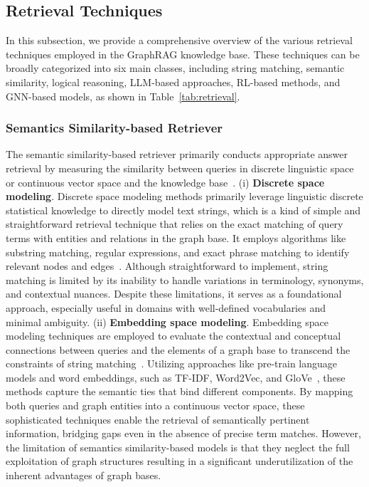 \documentclass[lettersize,journal]{IEEEtran}
\begin{document}
\subsection{Retrieval Techniques}

In this subsection, we provide a comprehensive overview of the various retrieval techniques employed in the GraphRAG knowledge base. These techniques can be broadly categorized into six main classes, including string matching, semantic similarity, logical reasoning, LLM-based approaches, RL-based methods, and GNN-based models, as shown in Table~\ref{tab:retrieval}. 


\subsubsection{Semantics Similarity-based Retriever}
The semantic similarity-based retriever primarily conducts appropriate answer retrieval by measuring the similarity between queries in discrete linguistic space or continuous vector space and the knowledge base~\cite{zhu2024structugraphrag,liang2024empowering,he2024g,gubanov2024cancerkg,liu2024graphcoder}.
(i) \textbf{Discrete space modeling}.
Discrete space modeling methods primarily leverage linguistic discrete statistical knowledge to directly model text strings, which is a kind of simple and straightforward retrieval technique that relies on the exact matching of query terms with entities and relations in the graph base. It employs algorithms like substring matching, regular expressions, and exact phrase matching to identify relevant nodes and edges~\cite{he2024enhancing,gao2023retrieval,gubanov2024cancerkg,ma2024think-on-graph-2.0}. Although straightforward to implement, string matching is limited by its inability to handle variations in terminology, synonyms, and contextual nuances. Despite these limitations, it serves as a foundational approach, especially useful in domains with well-defined vocabularies and minimal ambiguity.
(ii) \textbf{Embedding space modeling}.
Embedding space modeling techniques are employed to evaluate the contextual and conceptual connections between queries and the elements of a graph base to transcend the constraints of string matching~\cite{zhu2024structugraphrag,he2024g,liu2024graphcoder,liang2024empowering}. Utilizing approaches like pre-train language models and word embeddings, such as TF-IDF, Word2Vec, and GloVe~\cite{selva2021review,kenter2015short}, these methods capture the semantic ties that bind different components. By mapping both queries and graph entities into a continuous vector space, these sophisticated techniques enable the retrieval of semantically pertinent information, bridging gaps even in the absence of precise term matches. However, the limitation of semantics similarity-based models is that they neglect the full exploitation of graph structures resulting in a significant underutilization of the inherent advantages of graph bases.
\end{document}
